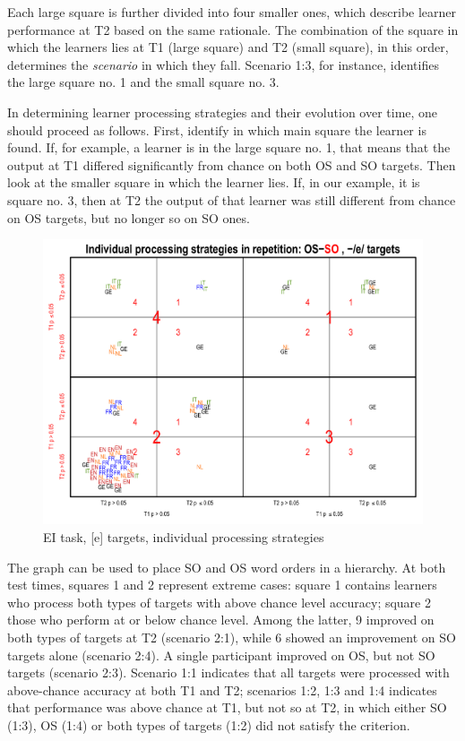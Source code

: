 Each large square is further divided into four smaller ones, which describe learner performance at T2 based on the same rationale. The combination of the square in which the learners lies at T1 (large square) and T2 (small square), in this order, determines the \textit{scenario} in which they fall. Scenario 1:3, for instance, identifies the large square no. 1 and the small square no. 3.

In determining learner processing strategies and their evolution over time, one should proceed as follows. First, identify in which main square the learner is found. If, for example, a learner is in the large square no. 1, that means that the output at T1 differed significantly from chance on both OS and SO targets. Then look at the smaller square in which the learner lies. If, in our example, it is square no. 3, then at T2 the output of that learner was still different from chance on OS targets, but no longer so on SO ones.

\begin{figure}
    \includegraphics[width=\textwidth]{figures/04-5.pdf}
    \caption{EI task, [e] targets, individual processing strategies}
    \label{fig:04:5}
\end{figure}

The graph can be used to place SO and OS word orders in a hierarchy. At both test times, squares 1 and 2 represent extreme cases: square 1 contains learners who process both types of targets with above chance level accuracy; square 2 those who perform at or below chance level. Among the latter, 9 improved on both types of targets at T2 (scenario 2:1), while 6 showed an improvement on SO targets alone (scenario 2:4). A single participant improved on OS, but not SO targets (scenario 2:3). Scenario 1:1 indicates that all targets were processed with above-chance accuracy at both T1 and T2; scenarios 1:2, 1:3 and 1:4 indicates that performance was above chance at T1, but not so at T2, in which either SO (1:3), OS (1:4) or both types of targets (1:2) did not satisfy the criterion.

